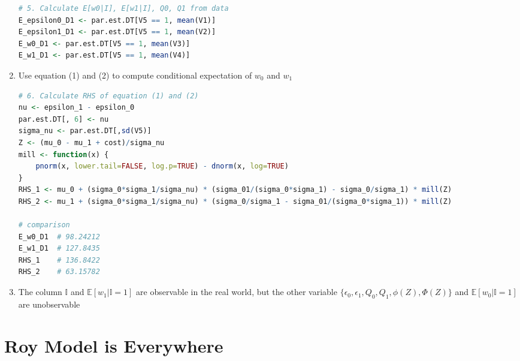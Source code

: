 \documentclass[11pt]{article}
\newcommand{\ept}{\mathbb{E}}
\begin{document}
\begin{enumerate}
                \begin{lstlisting}[language=R]
# 5. Calculate E[w0|I], E[w1|I], Q0, Q1 from data
E_epsilon0_D1 <- par.est.DT[V5 == 1, mean(V1)]
E_epsilon1_D1 <- par.est.DT[V5 == 1, mean(V2)]
E_w0_D1 <- par.est.DT[V5 == 1, mean(V3)]
E_w1_D1 <- par.est.DT[V5 == 1, mean(V4)]
                \end{lstlisting}
            
            \item Use equation (1) and (2) to compute conditional expectation of $w_0$ and $w_1$ 
            
                \begin{lstlisting}[language=R]
# 6. Calculate RHS of equation (1) and (2)
nu <- epsilon_1 - epsilon_0
par.est.DT[, 6] <- nu
sigma_nu <- par.est.DT[,sd(V5)]
Z <- (mu_0 - mu_1 + cost)/sigma_nu
mill <- function(x) {
    pnorm(x, lower.tail=FALSE, log.p=TRUE) - dnorm(x, log=TRUE)
}
RHS_1 <- mu_0 + (sigma_0*sigma_1/sigma_nu) * (sigma_01/(sigma_0*sigma_1) - sigma_0/sigma_1) * mill(Z)
RHS_2 <- mu_1 + (sigma_0*sigma_1/sigma_nu) * (sigma_0/sigma_1 - sigma_01/(sigma_0*sigma_1)) * mill(Z)

# comparison
E_w0_D1  # 98.24212
E_w1_D1  # 127.8435
RHS_1    # 136.8422
RHS_2    # 63.15782
                \end{lstlisting}
            
            \item The column $\mathbb{I}$ and $\ept[w_1 | \mathbb{I} = 1]$ are observable in the real world, but the other variable $\{\epsilon_0, \epsilon_1, Q_0, Q_1, \phi(Z), \Phi(Z)\}$ and $\ept[w_0 | \mathbb{I} = 1]$ are unobservable
        \end{enumerate}




\section{Roy Model is Everywhere}
\end{document}
